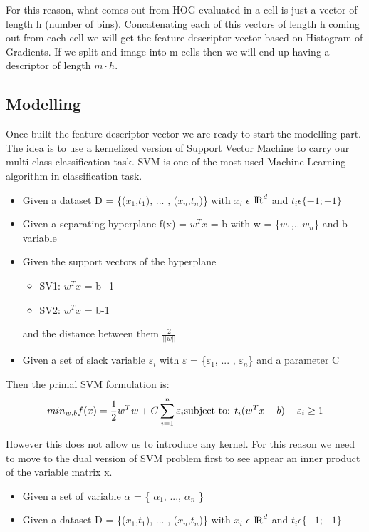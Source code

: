 \documentclass{article}
\begin{document}
For this reason, what comes out from HOG evaluated in a cell is just a vector of length h (number of bins). Concatenating each of this vectors of length h coming out from each cell we will get the feature descriptor vector based on Histogram of Gradients. If we split and image into m cells then we will end up having a descriptor of length $m\cdot h$.

\subsection{Modelling} 

Once built the feature descriptor vector we are ready to start the modelling part. 
The idea is to use a kernelized version of Support Vector Machine to carry our multi-class classification task.
SVM is one of the most used Machine Learning algorithm in classification task. 
\begin{itemize}
    \item Given a dataset D = \{($x_1$,$t_1$), ... , ($x_n$,$t_n$)\} with $x_i$ $\epsilon$ ${\rm I\!R}^d$ and $t_i \epsilon \{ -1; +1\}$ \\
    \item Given a separating hyperplane f(x) = $w^Tx$ = b with w = \{$w_1$,...$w_n$\} and b variable \\
    \item Given the support vectors of the hyperplane 
    \begin{itemize} 
    \item SV1: $w^Tx$ = b+1 \\ 
    \item SV2: $w^Tx$ = b-1
    \end{itemize}
    and the distance between them $\frac{2}{||w||}$
    \item Given a set of slack variable $\varepsilon_i$ with $\varepsilon$ = \{$\varepsilon_1$, ... , $\varepsilon_n$\} and a parameter C 
\end{itemize}

Then the primal SVM formulation is:
\[
min_{w,b} f(x) = \frac{1}{2} w^Tw + C \sum_{i=1}^n \varepsilon_i \\
\text{subject to: } t_i(w^Tx-b)+\varepsilon_i \geq 1
\]

However this does not allow us to introduce any kernel. For this reason we need to move to the dual version of SVM problem first to see appear an inner product of the variable matrix x.

\begin{itemize}
    \item Given a set of variable $\alpha$ = \{ $\alpha_1$, ..., $\alpha_n$ \} \\
    \item Given a dataset D = \{($x_1$,$t_1$), ... , ($x_n$,$t_n$)\} with $x_i$ $\epsilon$ ${\rm I\!R}^d$ and $t_i \epsilon \{ -1; +1\}$
\end{itemize}
\end{document}
